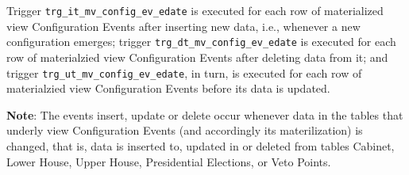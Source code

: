 Trigger \texttt{trg\_it\_mv\_config\_ev\_edate} is executed for each row of materialized view Configuration Events after inserting new data, i.e., whenever a new configuration emerges; trigger  
\texttt{trg\_dt\_mv\_config\_ev\_edate} is executed for each row of materialzied view Configuration Events after deleting data from it; and 
trigger \texttt{trg\_ut\_mv\_config\_ev\_edate}, in turn, is executed for each row of materialzied view Configuration Events before its data is updated.  

{\bf Note}: The events insert, update or delete occur whenever data in the tables that underly view Configuration Events (and accordingly its materilization) is changed, that is, data is inserted to, updated in or deleted from tables Cabinet, Lower House, Upper House, Presidential Elections, or Veto Points.


